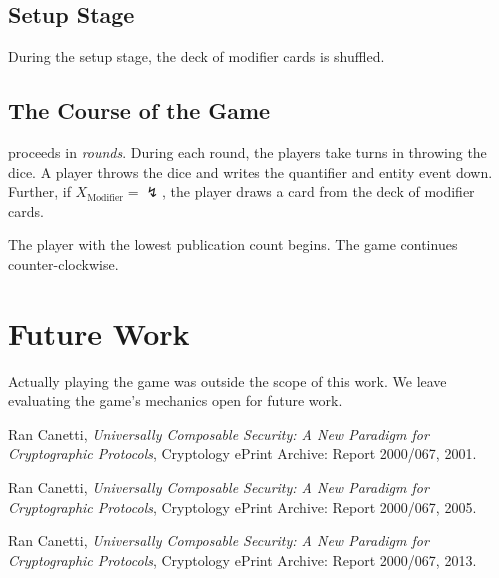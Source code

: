 \documentclass{llncs}
\begin{document}
\subsection{Setup Stage}
During the setup stage, the deck of modifier cards is shuffled.

\subsection{The Course of the Game}
\ucftw proceeds in \emph{rounds}.
During each round, the players take turns in throwing the dice.
A player throws the dice and writes the quantifier and entity event down.
Further, if $X_\text{Modifier} = \lightning$, the player draws a card from the deck of modifier cards. 

\begin{theorem}
	The player with the lowest publication count begins. The game continues counter-clockwise.
\end{theorem}

\section{Future Work}
Actually playing the game was outside the scope of this work.
We leave evaluating the game's mechanics open for future work.

\begin{thebibliography}{9}
  Ran Canetti,
  \emph{Universally Composable Security: A New Paradigm for Cryptographic Protocols},
  Cryptology ePrint Archive: Report 2000/067,
  2001.

  Ran Canetti,
  \emph{Universally Composable Security: A New Paradigm for Cryptographic Protocols},
  Cryptology ePrint Archive: Report 2000/067,
  2005.

  Ran Canetti,
  \emph{Universally Composable Security: A New Paradigm for Cryptographic Protocols},
  Cryptology ePrint Archive: Report 2000/067,
  2013.
\end{thebibliography}
\end{document}
